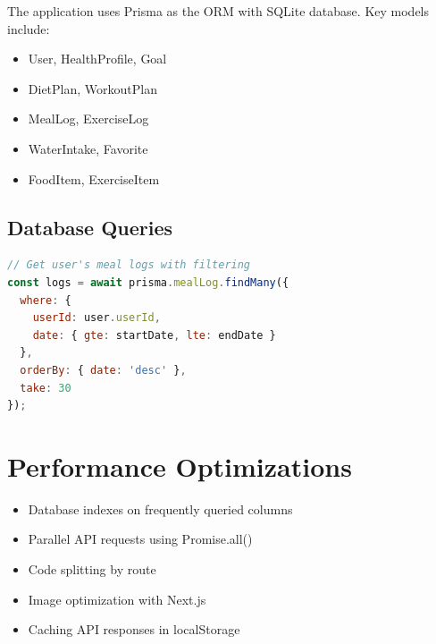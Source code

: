 The application uses Prisma as the ORM with SQLite database. Key models include:

\begin{itemize}
    \item User, HealthProfile, Goal
    \item DietPlan, WorkoutPlan
    \item MealLog, ExerciseLog
    \item WaterIntake, Favorite
    \item FoodItem, ExerciseItem
\end{itemize}

\subsection{Database Queries}

\begin{lstlisting}[language=JavaScript, caption=Example Prisma Query]
// Get user's meal logs with filtering
const logs = await prisma.mealLog.findMany({
  where: {
    userId: user.userId,
    date: { gte: startDate, lte: endDate }
  },
  orderBy: { date: 'desc' },
  take: 30
});
\end{lstlisting}

\section{Performance Optimizations}

\begin{itemize}
    \item Database indexes on frequently queried columns
    \item Parallel API requests using Promise.all()
    \item Code splitting by route
    \item Image optimization with Next.js
    \item Caching API responses in localStorage
\end{itemize}
